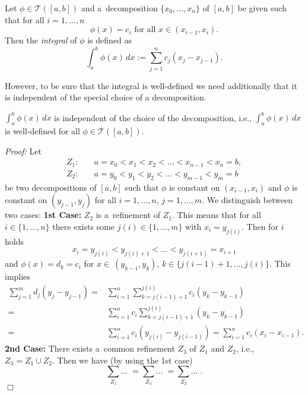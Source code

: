 

\begin{Definition}
Let $\phi\in\mathcal{T}([a,b])$ and a~decomposition $\{x_0,\ldots,x_n\}$ of $[a,b]$ be given such that for all $i=1,\ldots,n$
\[\phi(x)=c_i\text{ for all }x\in (x_{i-1},x_i) .\]
Then the \emph{integral} of $\phi$ is defined as
\[\int_a^b\phi(x) \, dx:=\sum_{j=1}^{n}c_j(x_{j}-x_{j-1}).\]
\end{Definition}


However, to be sure that the integral is well-defined we need additionally that it is independent of the special choice of a decomposition.
\begin{Lemma}{}
$\int_a^b\phi(x)\, dx$ is independent of the choice of the decomposition, i.e., $\int_a^b\phi(x)\, dx$ is well-defined for all $\phi\in\mathcal{T}([a,b])$.
\end{Lemma}


{\em Proof:}
Let
\[
\begin{aligned}
Z_1:\quad&a=x_0<x_1<x_2<\ldots<x_{n-1}<x_n=b,\\
Z_2:\quad&a=y_0<y_1<y_2<\ldots<y_{m-1}<y_m=b
\end{aligned}
\]
be two decompositions of $[a,b]$ such that $\phi$ is constant on $(x_{i-1},x_i)$ and $\phi$ is constant on $(y_{j-1},y_j)$ for all $i=1,\ldots,n$, $j=1,\ldots,m$. We distinguish between two cases:
{\bfseries 1st Case:} $Z_2$ is a~refinement of $Z_1$. This means that for all $i\in\{1,\ldots,n\}$ there exists some $j(i)\in\{1,\ldots,m\}$
with $x_i=y_{j(i)}$. Then for $i$ holds
\[x_i=y_{j(i)}<y_{j(i)+1}<\ldots<y_{j(i+1)}=x_{i+1}\]
and $\phi(x)=d_k=c_i$ for $x\in~(y_{k-1},y_k)$, $k\in\{j(i-1)+1,\ldots,j(i)\}$. This implies
\[
\begin{aligned}
\sum_{j=1}^{m}d_j(y_{j}-y_{j-1})=&\sum_{i=1}^{n}\sum_{k=j(i-1)+1}^{j(i)}c_i(y_{k}-y_{k-1})\\
=&\sum_{i=1}^{n}c_i\sum_{k=j(i-1)+1}^{j(i)}(y_{k}-y_{k-1})\\
=&\sum_{i=1}^{n}c_i(y_{j(i)}-y_{j(i-1)})=\sum_{i=1}^{n}c_i(x_i-x_{i-1}).
\end{aligned}\]
{\bfseries 2nd Case:} There exists a~common refinement $Z_3$ of $Z_1$ and $Z_2$, i.e., $Z_3=Z_1\cup Z_2$. Then we have (by using the 1st case)
\[\sum_{Z_1}...\;=\sum_{Z_3}\ldots\;=\sum_{Z_2}\ldots\;.\]
$\Box$



